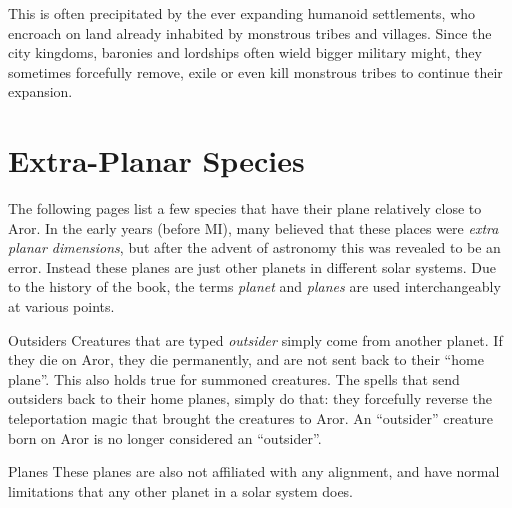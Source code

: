 This is often precipitated by the ever expanding humanoid settlements, who
encroach on land already inhabited by monstrous tribes and villages. Since the
city kingdoms, baronies and lordships often wield bigger military might, they
sometimes forcefully remove, exile or even kill monstrous tribes to continue
their expansion.












\section{Extra-Planar Species}
\label{sec:ExtraPlanar Species}

The following pages list a few species that have their plane relatively close
to Aror. In the early years (before MI), many believed that these places were
\emph{extra planar dimensions}, but after the advent of astronomy this was
revealed to be an error. Instead these planes are just other planets in
different solar systems. Due to the history of the book, the terms
\emph{planet} and \emph{planes} are used interchangeably at various points.

\begin{35e}{Outsiders}
  Creatures that are typed \emph{outsider} simply come from another planet. If
  they die on Aror, they die permanently, and are not sent back to their
  ``home plane''. This also holds true for summoned creatures. The spells that
  send outsiders back to their home planes, simply do that: they forcefully
  reverse the teleportation magic that brought the creatures to Aror. An
  ``outsider'' creature born on Aror is no longer considered an ``outsider''.
\end{35e}

\begin{35e}{Planes}
  These planes are also not affiliated with any alignment, and have normal
  limitations that any other planet in a solar system does.
\end{35e}






